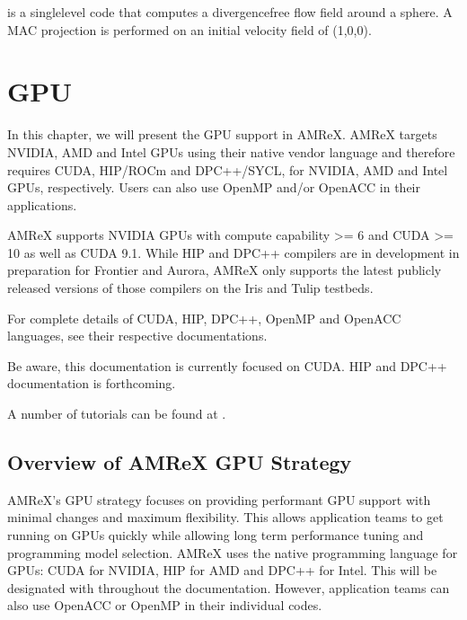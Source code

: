 \documentclass[letterpaper,10pt,english]{sphinxmanual}
\begin{document}
\sphinxAtStartPar
{} is a single\sphinxhyphen{}level code that computes a divergence\sphinxhyphen{}free
flow field around a sphere.  A MAC projection is performed on an initial velocity
field of (1,0,0).


\chapter{GPU}
\label{\detokenize{GPU_Chapter:gpu}}\label{\detokenize{GPU_Chapter:chap-gpu}}\label{\detokenize{GPU_Chapter::doc}}
\sphinxAtStartPar
In this chapter, we will present the GPU support in AMReX.  AMReX targets
NVIDIA, AMD and Intel GPUs using their native vendor language and therefore
requires CUDA, HIP/ROCm and DPC++/SYCL, for NVIDIA, AMD and Intel GPUs, respectively.
Users can also use OpenMP and/or OpenACC in their applications.

\sphinxAtStartPar
AMReX supports NVIDIA GPUs with compute capability \textgreater{}= 6 and CUDA \textgreater{}= 10
as well as CUDA 9.1.  While HIP and DPC++ compilers are in development in
preparation for Frontier and Aurora, AMReX only supports the latest
publicly released versions of those compilers on the Iris and Tulip testbeds.

\sphinxAtStartPar
For complete details of CUDA, HIP, DPC++, OpenMP and OpenACC
languages, see their respective documentations.

\sphinxAtStartPar
Be aware, this documentation is currently focused on CUDA.  HIP and DPC++ documentation
is forthcoming.

\sphinxAtStartPar
A number of tutorials can be found at .


\section{Overview of AMReX GPU Strategy}
\label{\detokenize{GPU:overview-of-amrex-gpu-strategy}}\label{\detokenize{GPU:sec-gpu-overview}}\label{\detokenize{GPU::doc}}
\sphinxAtStartPar
AMReX’s GPU strategy focuses on providing performant GPU support
with minimal changes and maximum flexibility.  This allows
application teams to get running on GPUs quickly while allowing
long term performance tuning and programming model selection.  AMReX
uses the native programming language for GPUs: CUDA for NVIDIA, HIP
for AMD and DPC++ for Intel. This will be designated with 
throughout the documentation.  However, application teams can also use
OpenACC or OpenMP in their individual codes.
\end{document}
